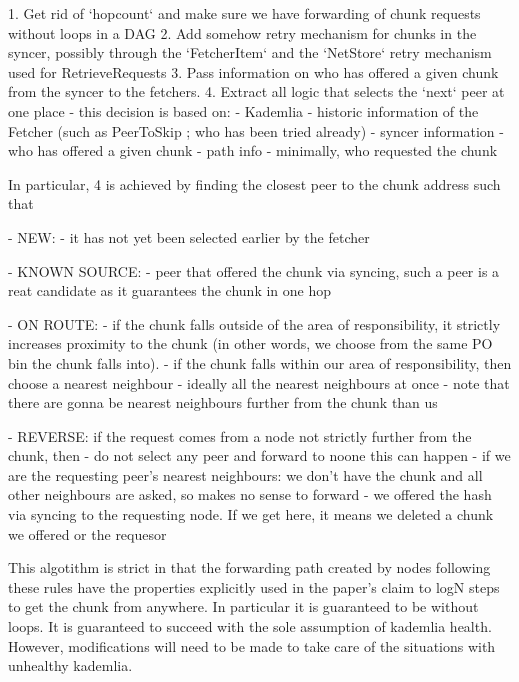 1. Get rid of `hopcount` and make sure we have forwarding of chunk requests without loops in a DAG
2. Add somehow retry mechanism for chunks in the syncer, possibly through the `FetcherItem` and the `NetStore` retry mechanism used for RetrieveRequests
3. Pass information on who has offered a given chunk from the syncer to the fetchers.
4. Extract all logic that selects the `next` peer at one place - this decision is based on:
    - Kademlia
    - historic information of the Fetcher (such as PeerToSkip ; who has been tried already)
    - syncer information - who has offered a given chunk
    - path info - minimally, who requested the chunk

In particular, 4 is achieved by finding the closest peer to the chunk address such that
    
    
- NEW: 
    - it has not yet been selected earlier by the fetcher
    
- KNOWN SOURCE:
    - peer that offered the chunk via syncing, such a peer is a reat candidate as it guarantees the chunk in one hop
    
- ON ROUTE: 
    - if the chunk falls outside of the area of responsibility, it strictly increases proximity to the chunk (in other words, we choose from the same PO bin the chunk falls into). 
    - if the chunk falls within our area of responsibility, then choose a nearest neighbour - ideally all the nearest neighbours at once - note that there are gonna be nearest neighbours further from the chunk than us

- REVERSE: if the request comes from a node not strictly further from the chunk, then
  - do not select any peer and forward to noone
      this can happen 
      - if we are the requesting peer's nearest neighbours:
        we don't have the chunk and all other neighbours are asked, so makes no sense to forward
      - we offered the hash via syncing to the requesting node. If we get here, it means we deleted a chunk we offered or the  requesor 
      
      This algotithm is strict in that the forwarding path created by nodes following these rules have the properties explicitly used in the paper's claim to logN steps to get the chunk from anywhere. 
      In particular it is guaranteed to be without loops. It is guaranteed to succeed with the sole assumption of kademlia health. However, modifications will need to be made to take care of the situations with unhealthy kademlia.